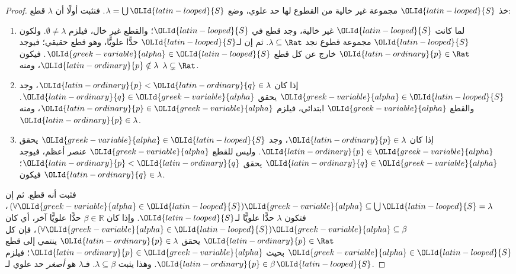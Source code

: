 \documentclass[../../../include/open-logic-section]{subfiles}
\begin{document}
\begin{proof}
خذ ${\OLId{latin-looped}{S}}$ مجموعة غير خالية من القطوع لها حد علوي، وضع $\lambda
= \bigcup {\OLId{latin-looped}{S}}$.
فنثبت أولًا أن $\lambda$ قطع:
\begin{enumerate}
\item لما كانت ${\OLId{latin-looped}{S}}$ غير خالية، وجد قطع في ${\OLId{latin-looped}{S}}$؛ والقطع غير خال، فيلزم $\emptyset \neq \lambda$. ولكون ${\OLId{latin-looped}{S}}$ مجموعة قطوع نجد $\lambda \subseteq \Rat$. ثم إن لـ${\OLId{latin-looped}{S}}$ حدًّا علويًّا، وهو قطع حقيقي؛ فيوجد ${\OLId{latin-ordinary}{p}} \in
\Rat$ خارج عن كل قطع $ {\OLId{greek-variable}{alpha}} \in {\OLId{latin-looped}{S}}$. فيكون ${\OLId{latin-ordinary}{p}}\notin \lambda$، ومنه $\lambda \subsetneq \Rat$.
\item إذا كان ${\OLId{latin-ordinary}{p}} < {\OLId{latin-ordinary}{q}} \in \lambda$، وجد $ {\OLId{greek-variable}{alpha}} \in {\OLId{latin-looped}{S}}$ يحقق ${\OLId{latin-ordinary}{q}} \in {\OLId{greek-variable}{alpha}}$. والقطع ${\OLId{greek-variable}{alpha}}$ ابتدائي، فيلزم ${\OLId{latin-ordinary}{p}} \in {\OLId{greek-variable}{alpha}}$، ومنه ${\OLId{latin-ordinary}{p}} \in \lambda$.
\item إذا كان ${\OLId{latin-ordinary}{p}} \in \lambda$، وجد $ {\OLId{greek-variable}{alpha}} \in {\OLId{latin-looped}{S}}$ يحقق ${\OLId{latin-ordinary}{p}} \in
{\OLId{greek-variable}{alpha}}$. وليس للقطع ${\OLId{greek-variable}{alpha}}$ عنصر أعظم، فيوجد ${\OLId{latin-ordinary}{q}} \in {\OLId{greek-variable}{alpha}}$ يحقق ${\OLId{latin-ordinary}{p}} < {\OLId{latin-ordinary}{q}}$؛ فيكون ${\OLId{latin-ordinary}{q}} \in \lambda$.
\end{enumerate}
فثبت أنه قطع. ثم إن
$(\forall {\OLId{greek-variable}{alpha}} \in {\OLId{latin-looped}{S}}){\OLId{greek-variable}{alpha}} \subseteq \bigcup {\OLId{latin-looped}{S}} = \lambda$، فتكون $\lambda$ حدًّا علويًّا لـ${\OLId{latin-looped}{S}}$. وإذا كان $\beta \in \mathbb{R}$ حدًّا علويًّا آخر، أي كان $(\forall {\OLId{greek-variable}{alpha}} \in {\OLId{latin-looped}{S}}){\OLId{greek-variable}{alpha}} \subseteq \beta$، فإن كل ${\OLId{latin-ordinary}{p}} \in \Rat$ يحقق ${\OLId{latin-ordinary}{p}} \in \lambda$ ينتمي إلى قطع $ {\OLId{greek-variable}{alpha}} \in {\OLId{latin-looped}{S}}$ بحيث ${\OLId{latin-ordinary}{p}} \in {\OLId{greek-variable}{alpha}}$؛ فيلزم ${\OLId{latin-ordinary}{p}} \in \beta$. وهذا يثبت $\lambda
\subseteq \beta$. فـ$\lambda$ هو \emph{أصغر} حد علوي لـ${\OLId{latin-looped}{S}}$.
\end{proof}
\end{document}
